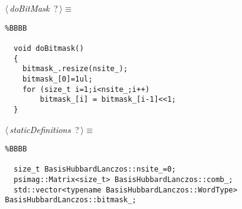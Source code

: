 \documentclass{report}
\begin{document}
\begin{flushleft} \small
\begin{minipage}{\linewidth}\label{scrap15}\raggedright\small
{} $\langle\,${\it doBitMask}\nobreak\ {\footnotesize {?}}$\,\rangle\equiv$
\begin{lstlisting}%BBBB
    
  void doBitmask()  
  {  
  	bitmask_.resize(nsite_);  
  	bitmask_[0]=1ul;  
  	for (size_t i=1;i<nsite_;i++)  
  		bitmask_[i] = bitmask_[i-1]<<1;  
  }  \end{lstlisting}
\end{minipage}\vspace{4ex}
\end{flushleft}
\begin{flushleft} \small
\begin{minipage}{\linewidth}\label{scrap16}\raggedright\small
{} $\langle\,${\it staticDefinitions}\nobreak\ {\footnotesize {?}}$\,\rangle\equiv$
\begin{lstlisting}%BBBB
    
  size_t BasisHubbardLanczos::nsite_=0;  
  psimag::Matrix<size_t> BasisHubbardLanczos::comb_;  
  std::vector<typename BasisHubbardLanczos::WordType> BasisHubbardLanczos::bitmask_;  \end{lstlisting}
\end{minipage}\vspace{4ex}
\end{flushleft}
\end{document}
